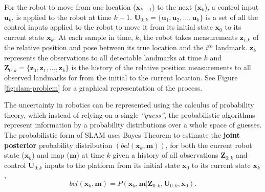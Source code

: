 For the robot to move from one location ($\mathbf{x}_{k-1}$) to the next  ($\mathbf{x}_{k}$),  a control input $\mathbf{u}_{k}$, is applied to the robot at time $k-1$. $\mathbf{U}_{0:k}=\{\mathbf{u}_1, \mathbf{u}_2,\dots{}, \mathbf{u}_k\}$ is a set of all the control inputs applied to the robot to move it from its initial state $\mathbf{x}_{0}$ to its current state $\mathbf{x}_{k}$. At each sample in time, $k$, the robot takes measurements $\mathbf{z}_{i,k}$ of the relative position and pose between its true location and the $i^{th}$ landmark. $\mathbf{z}_{k}$ represents the observations to all detectable landmarks at time $k$ and $\mathbf{Z}_{0:k}=\{\mathbf{z}_0, \mathbf{z}_1,\dots{}, \mathbf{z}_k\}$ is the history of the relative position measurements to all observed landmarks for from the initial to the current location. See Figure \ref{fig:slam-problem} for a graphical representation of the process.


The uncertainty in robotics can be represented using the calculus of probability theory, which instead of relying on a single \textit{``guess''}, the probabilistic algorithms represent information by a probability distributions over a whole space of guesses. The probabilistic form of SLAM uses Bayes Theorem to estimate the \textbf{joint posterior} probability distribution $(bel(\mathbf{x}_{k},\mathbf{m}))$, for both the current robot state ($\mathbf{x}_{k}$) and map ($\mathbf{m}$) at time $k$ given a history of all observations $\mathbf{Z}_{0:k}$  and control $\mathbf{U}_{0:k}$ inputs to the platform from its initial state $\mathbf{x}_{0}$ to its current state $\mathbf{x}_{k}$, 
\begin{equation}
    bel(\mathbf{x}_{k},\mathbf{m}) = P(\mathbf{x}_{k},\mathbf{m}|\mathbf{Z}_{0:k},\mathbf{U}_{0:k},\mathbf{x}_{0}).
\label{eq:slamproblem}
\end{equation}

